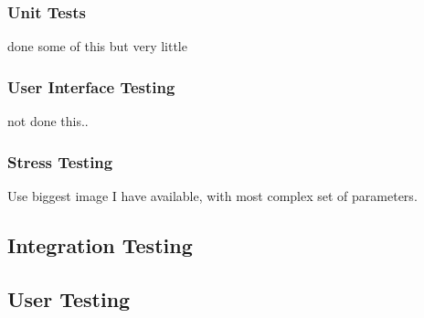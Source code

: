 \subsubsection{Unit Tests}

done some of this but very little

\subsubsection{User Interface Testing}

not done this..

\subsubsection{Stress Testing}

Use biggest image I have available, with most complex set of parameters.

\subsection{Integration Testing}

\subsection{User Testing}

